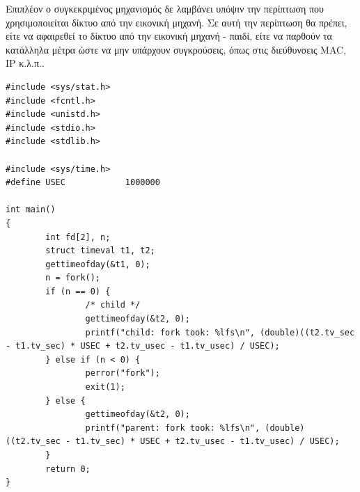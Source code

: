 Επιπλέον ο συγκεκριμένος μηχανισμός δε λαμβάνει υπόψιν την περίπτωση
που χρησιμοποιείται δίκτυο από την εικονική μηχανή. Σε αυτή την περίπτωση θα
πρέπει, είτε να αφαιρεθεί το δίκτυο από την εικονική μηχανή - παιδί, είτε να
παρθούν τα κατάλληλα μέτρα ώστε να μην υπάρχουν συγκρούσεις, όπως στις
διεύθυνσεις MAC, IP κ.λ.π.. 

\begin{lstlisting}[label={time_test}]
#include <sys/stat.h>
#include <fcntl.h>
#include <unistd.h>
#include <stdio.h>
#include <stdlib.h>

#include <sys/time.h>
#define USEC            1000000

int main()
{
        int fd[2], n;
        struct timeval t1, t2;
        gettimeofday(&t1, 0);
        n = fork();
        if (n == 0) {
                /* child */
                gettimeofday(&t2, 0);
                printf("child: fork took: %lfs\n", (double)((t2.tv_sec - t1.tv_sec) * USEC + t2.tv_usec - t1.tv_usec) / USEC);
        } else if (n < 0) {
                perror("fork");
                exit(1);
        } else {
                gettimeofday(&t2, 0);
                printf("parent: fork took: %lfs\n", (double)((t2.tv_sec - t1.tv_sec) * USEC + t2.tv_usec - t1.tv_usec) / USEC);
        }
        return 0;
}

\end{lstlisting}
